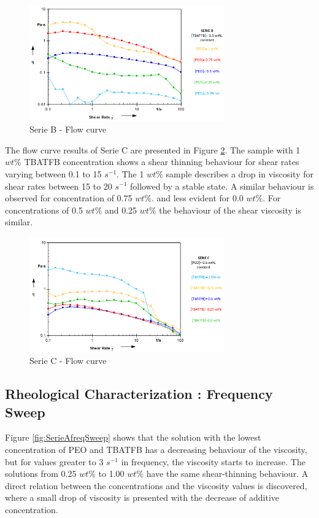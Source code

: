 \begin{figure}[th]
\centering
\includegraphics[width=0.75\textwidth]{./Figures/SerieBflowCurve.png}
\decoRule
\caption[Serie B - Flow curve]{Serie B - Flow curve}
\label{fig:SerieBflowCurve}
\end{figure}

The flow curve results of Serie C are presented in Figure \ref{fig:SerieCflowCurve}. The sample with 1 $w t \%$ TBATFB concentration shows a shear thinning behaviour for shear rates varying between 0.1 to 15 $s^{-1}$. The 1 $w t \%$ sample describes a drop in viscosity for shear rates between 15 to 20 $s^{-1}$ followed by a stable state. A similar behaviour is observed for concentration of 0.75 $w t \%$. and less evident for 0.0 $w t \%$. For concentrations of 0.5 $w t \%$ and 0.25 $w t \%$ the behaviour of the shear viscosity is similar.

\begin{figure}[th]
\centering
\includegraphics[width=0.75\textwidth]{./Figures/SerieCflowCurve.png}
\decoRule
\caption[Serie C - Flow curve]{Serie C - Flow curve}
\label{fig:SerieCflowCurve}
\end{figure}

\subsection{Rheological Characterization : \textbf{Frequency Sweep}}
Figure \ref{fig:SerieAfreqSweep} shows that the solution with the lowest concentration of PEO and TBATFB has a decreasing behaviour of the viscosity, but for values greater to 3 $s^{-1}$ in frequency, the viscosity starts to increase. The solutions from 0.25 $w t \%$ to 1.00 $w t \%$ have the same shear-thinning behaviour. A direct relation between the concentrations and the viscosity values is discovered, where a small drop of viscosity is presented with the decrease of additive concentration.

